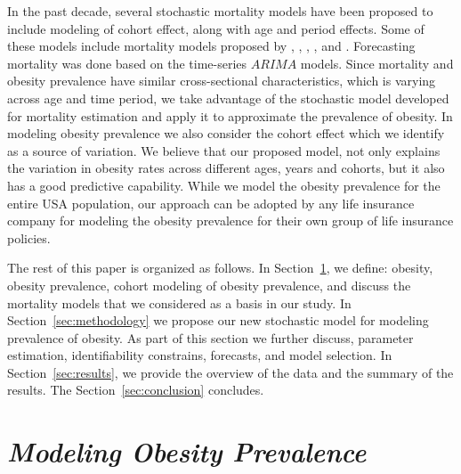 \documentclass[11pt,letterpaper]{article}
\numberwithin{equation}{section}
\begin{document}
In the past decade, several stochastic mortality models have been proposed to include modeling of cohort effect, along with age and period effects. Some of these models include mortality models proposed by \cite{Renshaw+Haberman:2006}, \cite{Cairns+Blake+Dowd:2006b}, \cite{Cairns+Blake+Dowd:2008a}, \cite{Cairns+Blake+Dowd+Coughlan+Epstein+Ong+Balevich:2009}, and \cite{Cairns+Blake+Dowd+Coughlan+Epstein+Khalaf+Allah:2011}. Forecasting mortality was done based on the time-series $ARIMA$ models. Since mortality and obesity prevalence have similar cross-sectional characteristics, which is varying across age and time period, we take advantage of the stochastic model developed for mortality estimation and apply it to approximate the prevalence of obesity. In modeling obesity prevalence we also consider the cohort effect which we identify as a source of variation. We believe that our proposed model, not only explains the variation in obesity rates across different ages, years and cohorts, but it also has a good predictive capability. While we model the obesity prevalence for the entire USA population, our approach can be adopted by any life insurance company for modeling the obesity prevalence for their own group of life insurance policies.

The rest of this paper is organized as follows. In Section~\ref{sec:modeling}, we define: obesity, obesity prevalence, cohort modeling of obesity prevalence, and discuss the mortality models that we considered as a basis in our study.  In Section~\ref{sec:methodology} we propose our new stochastic model for modeling prevalence of obesity. As part of this section we further discuss, parameter estimation, identifiability constrains, forecasts, and model selection. In Section~\ref{sec:results}, we provide the overview of the data and the summary of the results. The Section~\ref{sec:conclusion} concludes.


\section{\textit{Modeling Obesity Prevalence}}\label{sec:modeling}
\end{document}
